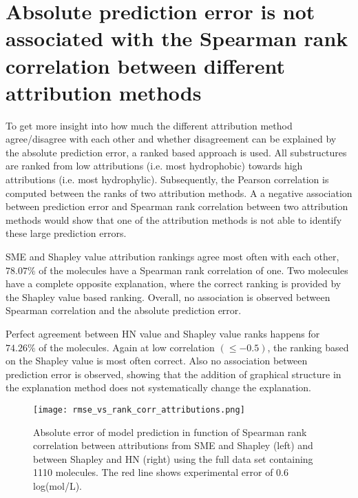\section{Absolute prediction error is not associated with the Spearman rank correlation between different attribution methods}


To get more insight into how much the different attribution method agree/disagree 
with each other and whether disagreement can be explained by the absolute prediction 
error, a ranked based approach is used. All substructures are ranked from low attributions 
(i.e. most hydrophobic) towards high attributions (i.e. most hydrophylic). Subsequently,
the Pearson correlation is computed between the ranks of two attribution methods. A 
a negative association between prediction error and Spearman rank correlation
between two attribution methods would show that one of the attribution methods is not 
able to identify these large prediction errors. 


SME and Shapley value attribution rankings agree most often with each other, $78.07\%$
of the molecules have a Spearman rank correlation of one. Two molecules have 
a complete opposite explanation, where the correct ranking is provided by the 
Shapley value based ranking. Overall, no association is observed between Spearman 
correlation and the absolute prediction error. 

Perfect agreement between HN value and Shapley value ranks happens for 
$74.26\%$ of the molecules. Again at low correlation $( \le -0.5)$, the ranking based on 
the Shapley value is most often correct. Also no association between prediction error 
is observed, showing that the addition of graphical structure in the explanation 
method does not systematically change the explanation.


 

\begin{figure}[h]
    \centering
    \texttt{[image: rmse\_vs\_rank\_corr\_attributions.png]}
    \caption{Absolute error of model prediction in function of Spearman rank correlation between 
        attributions from SME and Shapley (left) and between Shapley and HN (right) using the full 
        data set containing 1110 molecules. The red line shows experimental error of 0.6 log(mol/L).
    }
\end{figure}


